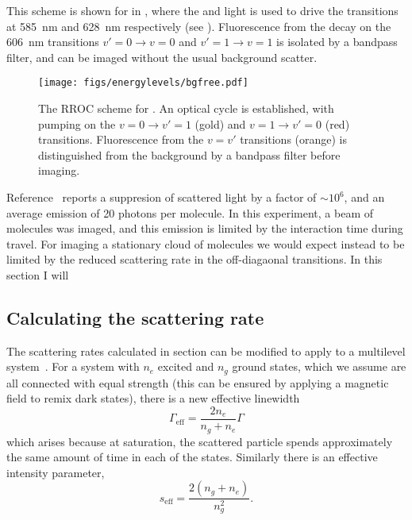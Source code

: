 This scheme is shown for \CaF{} in , where
the  and  light is used to drive the transitions at
\SI{585}{\nano\meter} and \SI{628}{\nano\meter} respectively (see
). Fluorescence from the decay on the
\SI{606}{\nano\meter} transitions $v'=0\rightarrow v=0$ and $v'=1\rightarrow
v=1$ is isolated by a bandpass filter, and can be imaged without the usual
background scatter.

\begin{figure}
  \centering
  \texttt{[image: figs/energylevels/bgfree.pdf]}
  \caption{
  The RROC scheme for \CaF{}. An optical cycle is established, with pumping on
  the $v=0 \rightarrow v'=1$ (gold) and $v=1 \rightarrow v'=0$ (red) transitions.
  Fluorescence from the $v=v'$ transitions (orange) is distinguished from the
  background by a bandpass filter before imaging.
  }
  \label{exper:fig:bgfreelevels}
\end{figure}

Reference~\cite{Shaw2021} reports a suppresion of scattered light by a factor
of $\sim10^6$, and an average emission of 20 photons per molecule. In this
experiment, a beam of molecules was imaged, and this emission is limited by the
interaction time during travel. For imaging a stationary cloud of molecules we
would expect instead to be limited by the reduced scattering rate in the
off-diagaonal transitions. In this section I will 

\subsection{Calculating the scattering rate}

The scattering rates calculated in section  can be modified to
apply to a multilevel system~\cite{Metcalf1999}. For a system with $n_e$
excited and $n_g$ ground states, which we assume are all connected with equal
strength (this can be ensured by applying a magnetic field to remix dark
states), there is a new effective linewidth~\cite{}
%
\begin{equation}
  \Gamma_\text{eff} = \frac{2n_e}{n_g + n_e}\Gamma
\end{equation}
%
which arises because at saturation, the scattered particle spends approximately
the same amount of time in each of the states. Similarly there is an effective
intensity parameter,
%
\begin{equation}
  s_\text{eff} = \frac{2(n_g + n_e)}{n_g^2}.
\end{equation}
%

